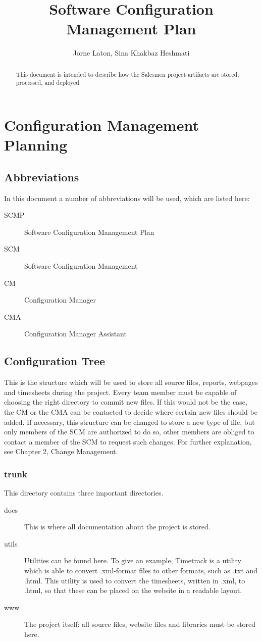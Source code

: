 \documentclass{report}
\author{Jorne Laton, Sina Khakbaz Heshmati}
\title{Software Configuration Management Plan}
\begin{document}
\maketitle
\tableofcontents

\begin{abstract}
This document is intended to describe how the Salesmen project artifacts
are stored, processed, and deployed.
\end{abstract}


\chapter{Configuration Management Planning}
\section{Abbreviations}
In this document a number of abbreviations will be used, which are listed here:
\begin{description}
\item[SCMP]
Software Configuration Management Plan
\item[SCM]
Software Configuration Management
\item[CM]
Configuration Manager
\item[CMA]
Configuration Manager Assistant
\end{description}
\section{Configuration Tree}
This is the structure which will be used to store all source files, reports, webpages and timesheets during the project.
Every team member must be capable of choosing the right directory to commit new files.
If this would not be the case, the CM or the CMA can be contacted to decide where certain new files should be added.
If necessary, this structure can be changed to store a new type of file, but only members of the SCM are authorized to do so, other members are obliged to contact a member of the SCM to request such changes.
For further explanation, see Chapter 2, Change Management.
\subsection{trunk}
This directory contains three important directories.
\begin{description}
\item[docs]
This is where all documentation about the project is stored.
\item[utils]
Utilities can be found here.
To give an example, Timetrack is a utility which is able to convert .xml-format files to other formats, such as .txt and .html.
This utility is used to convert the timesheets, written in .xml, to .html, so that these can be placed on the website in a readable layout.
\item[www]
The project itself: all source files, website files and libraries must be stored here.
\end{description}
\end{document}
